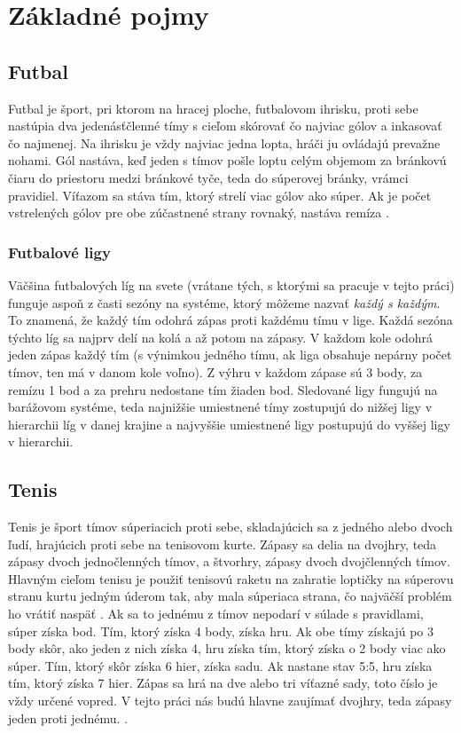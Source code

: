 \chapter{Základné pojmy}

\section{Futbal}
Futbal je šport, pri ktorom na hracej ploche, futbalovom ihrisku, proti sebe nastúpia dva jedenásťčlenné tímy s cieľom skórovať čo najviac gólov a inkasovať čo najmenej.
Na ihrisku je vždy najviac jedna lopta, hráči ju ovládajú prevažne nohami. 
Gól nastáva, keď jeden s tímov pošle loptu celým objemom za bránkovú čiaru do priestoru medzi bránkové tyče, teda do súperovej bránky, vrámci pravidiel. 
Víťazom sa stáva tím, ktorý strelí viac gólov ako súper. 
Ak je počet vstrelených gólov pre obe zúčastnené strany rovnaký, nastáva remíza 
\citep{hry1}.\\

\subsection{Futbalové ligy}
Väčšina futbalových líg na svete (vrátane tých, s ktorými sa pracuje v tejto práci) funguje aspoň z časti sezóny na systéme, ktorý môžeme nazvať \textit{každý s každým}.
To znamená, že každý tím odohrá zápas proti každému tímu v lige.
Každá sezóna týchto líg sa najprv delí na kolá a až potom na zápasy.
V každom kole odohrá jeden zápas každý tím (s výnimkou jedného tímu, ak liga obsahuje nepárny počet tímov, ten má v danom kole voľno).
Z výhru v každom zápase sú 3 body, za remízu 1 bod a za prehru nedostane tím žiaden bod.
Sledované ligy fungujú na barážovom systéme, teda najnižšie umiestnené tímy zostupujú do nižšej ligy v hierarchii líg v danej krajine a najvyššie umiestnené ligy postupujú do vyššej ligy v hierarchii.

\section{Tenis}
Tenis je šport tímov súperiacich proti sebe, skladajúcich sa z jedného alebo dvoch ľudí, hrajúcich proti sebe na tenisovom kurte.
Zápasy sa delia na dvojhry, teda zápasy dvoch jednočlenných tímov, a štvorhry, zápasy dvoch dvojčlenných tímov.
Hlavným cieľom tenisu je použiť tenisovú raketu na zahratie loptičky na súperovu stranu kurtu jedným úderom tak, aby mala súperiaca strana, čo najväčší problém ho vrátiť naspäť \citep{tenis:kor}. 
Ak sa to jednému z tímov nepodarí v súlade s pravidlami, súper získa bod.
Tím, ktorý získa 4 body, získa hru. Ak obe tímy získajú po 3 body skôr, ako jeden z nich získa 4, hru získa tím, ktorý získa o 2 body viac ako súper.
Tím, ktorý skôr získa 6 hier, získa sadu. Ak nastane stav 5:5, hru získa tím, ktorý získa 7 hier.
Zápas sa hrá na dve alebo tri víťazné sady, toto číslo je vždy určené vopred.
V tejto práci nás budú hlavne zaujímať dvojhry, teda zápasy jeden proti jednému.
\citep{hry2}.\\

